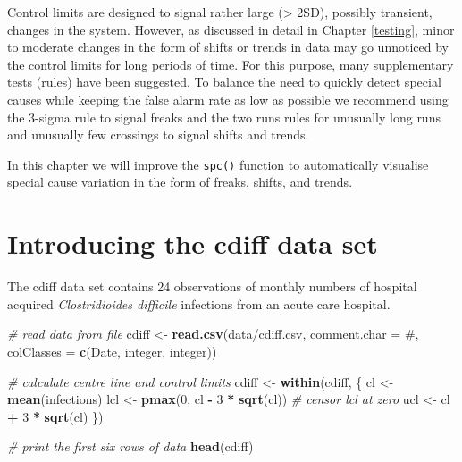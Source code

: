 \documentclass[
]{book}
\newenvironment{Shaded}{\begin{snugshade}}{\end{snugshade}}
\newcommand{\AttributeTok}[1]{\textcolor[rgb]{0.13,0.29,0.53}{#1}}
\newcommand{\CommentTok}[1]{\textcolor[rgb]{0.56,0.35,0.01}{\textit{#1}}}
\newcommand{\DecValTok}[1]{\textcolor[rgb]{0.00,0.00,0.81}{#1}}
\newcommand{\FunctionTok}[1]{\textcolor[rgb]{0.13,0.29,0.53}{\textbf{#1}}}
\newcommand{\NormalTok}[1]{#1}
\newcommand{\OtherTok}[1]{\textcolor[rgb]{0.56,0.35,0.01}{#1}}
\newcommand{\SpecialCharTok}[1]{\textcolor[rgb]{0.81,0.36,0.00}{\textbf{#1}}}
\newcommand{\StringTok}[1]{\textcolor[rgb]{0.31,0.60,0.02}{#1}}
\begin{document}
Control limits are designed to signal rather large (\textgreater{} 2SD), possibly transient, changes in the system. However, as discussed in detail in Chapter \ref{testing}, minor to moderate changes in the form of shifts or trends in data may go unnoticed by the control limits for long periods of time. For this purpose, many supplementary tests (rules) have been suggested. To balance the need to quickly detect special causes while keeping the false alarm rate as low as possible we recommend using the 3-sigma rule to signal freaks and the two runs rules for unusually long runs and unusually few crossings to signal shifts and trends.

In this chapter we will improve the \texttt{spc()} function to automatically visualise special cause variation in the form of freaks, shifts, and trends.

\section{Introducing the cdiff data set}\label{introducing-the-cdiff-data-set}

The cdiff data set contains 24 observations of monthly numbers of hospital acquired \emph{Clostridioides difficile} infections from an acute care hospital.

\begin{Shaded}
\begin{Highlighting}[]
\CommentTok{\# read data from file}
\NormalTok{cdiff }\OtherTok{\textless{}{-}} \FunctionTok{read.csv}\NormalTok{(}\StringTok{\textquotesingle{}data/cdiff.csv\textquotesingle{}}\NormalTok{,}
                  \AttributeTok{comment.char =} \StringTok{\textquotesingle{}\#\textquotesingle{}}\NormalTok{,}
                  \AttributeTok{colClasses =} \FunctionTok{c}\NormalTok{(}\StringTok{\textquotesingle{}Date\textquotesingle{}}\NormalTok{,}
                                 \StringTok{\textquotesingle{}integer\textquotesingle{}}\NormalTok{,}
                                 \StringTok{\textquotesingle{}integer\textquotesingle{}}\NormalTok{))}

\CommentTok{\# calculate centre line and control limits}
\NormalTok{cdiff }\OtherTok{\textless{}{-}} \FunctionTok{within}\NormalTok{(cdiff, \{}
\NormalTok{  cl  }\OtherTok{\textless{}{-}} \FunctionTok{mean}\NormalTok{(infections)}
\NormalTok{  lcl }\OtherTok{\textless{}{-}} \FunctionTok{pmax}\NormalTok{(}\DecValTok{0}\NormalTok{, cl }\SpecialCharTok{{-}} \DecValTok{3} \SpecialCharTok{*} \FunctionTok{sqrt}\NormalTok{(cl)) }\CommentTok{\# censor lcl at zero}
\NormalTok{  ucl }\OtherTok{\textless{}{-}}\NormalTok{ cl }\SpecialCharTok{+} \DecValTok{3} \SpecialCharTok{*} \FunctionTok{sqrt}\NormalTok{(cl)}
\NormalTok{\})}

\CommentTok{\# print the first six rows of data}
\FunctionTok{head}\NormalTok{(cdiff)}
\end{Highlighting}
\end{Shaded}
\end{document}
